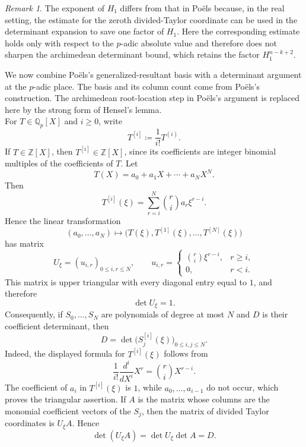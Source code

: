 \documentclass[12pt,reqno]{amsart}
\theoremstyle{definition}
\theoremstyle{remark}
\newtheorem{remark}[theorem]{Remark}
\newcommand{\Z}{\mathbb Z}
\newcommand{\Qp}{\mathbb Q_p}
\begin{document}
\begin{remark}\label{rem:raw-determinant}
The exponent of $H_1$ differs from that in Po\"els
\cite[proof of Proposition~5.1]{PoelsWirsing} because, in the real setting,
the estimate for the zeroth divided-Taylor coordinate can be used in the
determinant expansion to save one factor of $H_1$. Here the corresponding
estimate holds only with respect to the $p$-adic absolute value and therefore
does not sharpen the archimedean determinant bound, which retains the factor
$H_1^{n-k+2}$.
\end{remark}


We now combine Po\"els's \cite[proof of Proposition~5.1]{PoelsWirsing}
generalized-resultant basis with a determinant argument at the $p$-adic
place. The basis and its column count come from Po\"els's
\cite[proof of Proposition~5.1]{PoelsWirsing} construction. The archimedean
root-location step in Po\"els's argument is replaced here by the strong form
of Hensel's lemma.\\

For $T\in\Qp[X]$ and $i\geq0$, write
$$
T^{[i]}\coloneqq\frac{1}{i!}T^{(i)}.
$$
If $T\in\Z[X]$, then $T^{[i]}\in\Z[X]$, since its coefficients are integer binomial multiples of the coefficients of $T$. Let
$$
T(X)=a_0+a_1X+\cdots+a_NX^N.
$$
Then
$$
T^{[i]}(\xi)
=
\sum_{r=i}^N\binom{r}{i}a_r\xi^{r-i}.
$$
Hence the linear transformation
$$
(a_0,\ldots,a_N)
\longmapsto
\bigl(T(\xi),T^{[1]}(\xi),\ldots,T^{[N]}(\xi)\bigr)
$$
has matrix
$$
U_\xi
=
\left(u_{i,r}\right)_{0\leq i,r\leq N},
\qquad
u_{i,r}
=
\begin{cases}
\binom{r}{i}\xi^{r-i},&r\geq i,\\
0,&r<i.
\end{cases}
$$
This matrix is upper triangular with every diagonal entry equal to $1$, and therefore
$$
\det U_\xi=1.
$$
Consequently, if $S_0,\ldots,S_N$ are polynomials of degree at most $N$ and $D$ is their coefficient determinant, then
$$
D
=
\det\bigl(S_j^{[i]}(\xi)\bigr)_{0\leq i,j\leq N}.
$$
Indeed, the displayed formula for $T^{[i]}(\xi)$ follows from
$$
\frac{1}{i!}\frac{d^i}{dX^i}X^r
=
\binom{r}{i}X^{r-i}.
$$
The coefficient of $a_i$ in $T^{[i]}(\xi)$ is $1$, while $a_0,\ldots,a_{i-1}$ do not occur, which proves the triangular assertion. If $A$ is the matrix whose columns are the monomial coefficient vectors of the $S_j$, then the matrix of divided Taylor coordinates is $U_\xi A$. Hence
$$
\det(U_\xi A)=\det U_\xi\det A=D.
$$
\end{document}
